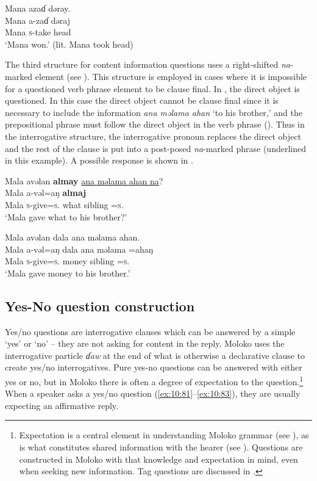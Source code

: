 \ea \label{ex:10:78}
Mana  azaɗ  dəray.\\
\gll  Mana  a-zaɗ  dəraj\\
      Mana  \textsc{s}-take  head\\
\glt  ‘Mana won.’ (lit. Mana took head)
\z

The third structure for content information questions uses a right-shifted \textit{na}{}-marked element (see ). This structure is employed in cases where it is impossible for a questioned verb phrase element to be clause final. In , the direct object is questioned. In this case the direct object cannot be clause final since it is necessary to include the information \textit{ana məlama ahan}\textit{ }‘to his brother,’ and the prepositional phrase must follow the direct object in the verb phrase ().  Thus in the interrogative structure, the interrogative pronoun replaces the direct object and the rest of the clause is put into a post-posed \textit{na}{}-marked phrase (underlined in this example). A possible response is shown in .

\ea \label{ex:10:79}
Mala  avəlan  \textbf{almay} \underline{ana  məlama  ahan  na}?\\
\gll  Mala  a-vəl=aŋ    \textbf{almaj}      \\
      Mala  \textsc{s}-give=\textsc{s}.{\IO}    what  {\DAT} sibling  =\textsc{s}.{\POSS}  {\PSP}\\
\glt  ‘Mala gave what to his brother?’
\z

\ea \label{ex:10:80}
Mala  avəlan  dala  ana  məlama  ahan.\\
\gll  Mala  a-vəl=aŋ    dala ana  məlama  =ahaŋ\\
      Mala  \textsc{s}-give=\textsc{s}.{\IO}    money  {\DAT} sibling  =\textsc{s}.{\POSS}\\
\glt  ‘Mala gave money to his brother.’
\z

\subsection{Yes-No question construction}\label{sec:10.3.2}
\hypertarget{RefHeading1213021525720847}{}
Yes/no questions are interrogative clauses which can be answered by a simple ‘yes’ or ‘no’ – they are not asking for content in the reply. Moloko uses the interrogative particle \textit{ɗaw} at the end of what is otherwise a declarative clause to create yes/no interrogatives. Pure yes-no questions can be answered with either yes or no, but in Moloko there is often a degree of expectation to the question.\footnote{Expectation is a central element in understanding Moloko grammar (see ), as is what constitutes shared information with the hearer (see ). Questions are constructed in Moloko with that knowledge and expectation in mind, even when seeking new information. Tag questions are discussed in .} When a speaker asks a yes/no question (\ref{ex:10:81}–\ref{ex:10:83}), they are usually expecting an affirmative reply. 

